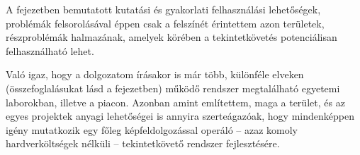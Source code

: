 A fejezetben bemutatott kutatási és gyakorlati felhasználási lehetőségek, problémák felsorolásával éppen csak a felszínét érintettem azon területek, részproblémák halmazának, amelyek körében a tekintetkövetés potenciálisan felhasználható lehet.

Való igaz, hogy a dolgozatom írásakor is már több, különféle elveken (összefoglalásukat lásd a  fejezetben) működő rendszer megtalálható egyetemi laborokban, illetve a piacon. Azonban amint említettem, maga a terület, és az egyes projektek anyagi lehetőségei is annyira szerteágazóak, hogy mindenképpen igény mutatkozik egy főleg képfeldolgozással operáló -- azaz komoly hardverköltségek nélküli -- tekintetkövető rendszer fejlesztésére.